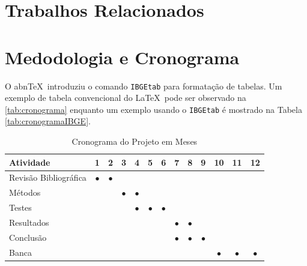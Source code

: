 \documentclass[
	12pt, %
	openright, %
	oneside, %
	a4paper, %
  sumario=tradicional, %
	english, %
	brazil, %
]{abntex2} %
\begin{document}
\chapter{Trabalhos Relacionados}\label{sec:TrabRel}
\lipsum[1][1]

\chapter{Medodologia e Cronograma}\label{sec:metodos}

O abn\TeX\ introduziu o comando \texttt{IBGEtab} para formatação de tabelas. Um exemplo de tabela convencional do \LaTeX\ pode ser observado na \autoref{tab:cronograma} enquanto um exemplo usando o \texttt{IBGEtab} é mostrado na Tabela \ref{tab:cronogramaIBGE}.

\begin{table}[htbp]
  \centering
    \caption[Cronograma Normal]{Cronograma do Projeto em Meses}
    \label{tab:cronograma}
    \begin{tabular}{lcccccccccccc} %
    \toprule
    \textbf{Atividade} & \textbf{1} & \textbf{2} & \textbf{3} & \textbf{4} & \textbf{5} & \textbf{6} & \textbf{7} & \textbf{8} & \textbf{9} & \textbf{10} & \textbf{11} & \textbf{12} \\
    \midrule
        Revisão Bibliográfica & $\bullet$ & $\bullet$ & & & & & & & & & & \\
        Métodos & & & $\bullet$ & $\bullet$ & & & & & & & & \\
        Testes & & & & $\bullet$ & $\bullet$ & $\bullet$ & & & & & & \\
        Resultados & & & & & & & $\bullet$ & $\bullet$ & & & & \\
        Conclusão & & & & & & & $\bullet$ & $\bullet$ & $\bullet$ & & & \\
        Banca & & & & & & &&&& $\bullet$ & $\bullet$ & $\bullet$ \\
    \bottomrule
    \end{tabular}%
\end{table}%
\end{document}

